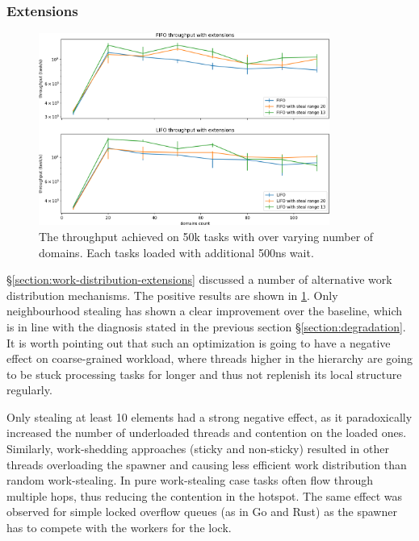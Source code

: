 \documentclass[12pt,a4paper,twoside]{report}
\begin{document}
\subsubsection{Extensions}
\label{section:extensions}

\begin{figure} 
     \centering
     \includegraphics[width=0.85\textwidth]{eval/packet-basic-distribution10-granular.png}
     \caption{The throughput achieved on 50k tasks with over varying number of domains. Each tasks loaded with additional 500ns wait.}
    \label{fig:packet-extenstions}
\end{figure}


\S\ref{section:work-distribution-extensions} discussed a number of alternative work distribution mechanisms. The positive results are shown in \ref{fig:packet-extenstions}. Only neighbourhood stealing has shown a clear improvement over the baseline, which is in line with the diagnosis stated in the previous section \S\ref{section:degradation}. It is worth pointing out that such an optimization is going to have a negative effect on coarse-grained workload, where threads higher in the hierarchy are going to be stuck processing tasks for longer and thus not replenish its local structure regularly. 

\label{paragraph:overflow-queue-bad-1}
Only stealing at least 10 elements had a strong negative effect, as it paradoxically increased the number of underloaded threads and contention on the loaded ones. Similarly, work-shedding approaches (sticky and non-sticky) resulted in other threads overloading the spawner and causing less efficient work distribution than random work-stealing. In pure work-stealing case tasks often flow through multiple hops, thus reducing the contention in the hotspot. The same effect was observed for simple locked overflow queues (as in Go and Rust) as the spawner has to compete with the workers for the lock.
\end{document}
